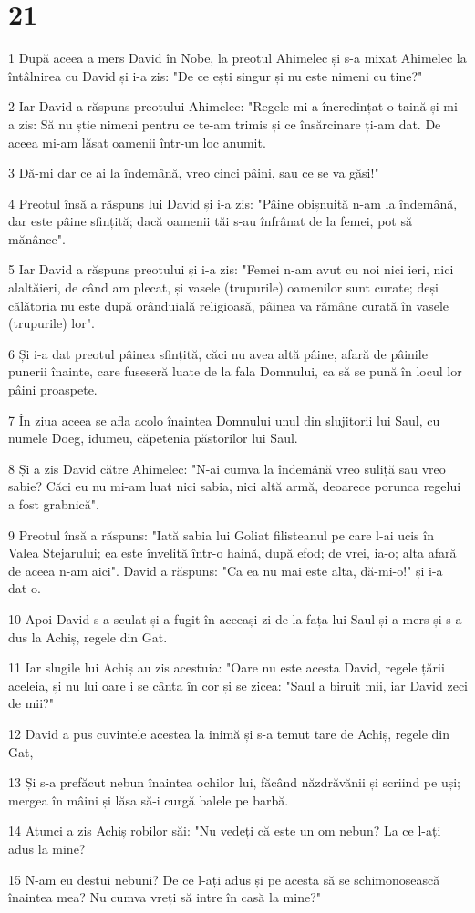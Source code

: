 \chapter{21}

\par 1 După aceea a mers David în Nobe, la preotul Ahimelec și s-a mixat Ahimelec la întâlnirea cu David și i-a zis: "De ce ești singur și nu este nimeni cu tine?"
\par 2 Iar David a răspuns preotului Ahimelec: "Regele mi-a încredințat o taină și mi-a zis: Să nu știe nimeni pentru ce te-am trimis și ce însărcinare ți-am dat. De aceea mi-am lăsat oamenii într-un loc anumit.
\par 3 Dă-mi dar ce ai la îndemână, vreo cinci pâini, sau ce se va găsi!"
\par 4 Preotul însă a răspuns lui David și i-a zis: "Pâine obișnuită n-am la îndemână, dar este pâine sfințită; dacă oamenii tăi s-au înfrânat de la femei, pot să mănânce".
\par 5 Iar David a răspuns preotului și i-a zis: "Femei n-am avut cu noi nici ieri, nici alaltăieri, de când am plecat, și vasele (trupurile) oamenilor sunt curate; deși călătoria nu este după orânduială religioasă, pâinea va rămâne curată în vasele (trupurile) lor".
\par 6 Și i-a dat preotul pâinea sfințită, căci nu avea altă pâine, afară de pâinile punerii înainte, care fuseseră luate de la fala Domnului, ca să se pună în locul lor pâini proaspete.
\par 7 În ziua aceea se afla acolo înaintea Domnului unul din slujitorii lui Saul, cu numele Doeg, idumeu, căpetenia păstorilor lui Saul.
\par 8 Și a zis David către Ahimelec: "N-ai cumva la îndemână vreo suliță sau vreo sabie? Căci eu nu mi-am luat nici sabia, nici altă armă, deoarece porunca regelui a fost grabnică".
\par 9 Preotul însă a răspuns: "Iată sabia lui Goliat filisteanul pe care l-ai ucis în Valea Stejarului; ea este învelită într-o haină, după efod; de vrei, ia-o; alta afară de aceea n-am aici". David a răspuns: "Ca ea nu mai este alta, dă-mi-o!" și i-a dat-o.
\par 10 Apoi David s-a sculat și a fugit în aceeași zi de la fața lui Saul și a mers și s-a dus la Achiș, regele din Gat.
\par 11 Iar slugile lui Achiș au zis acestuia: "Oare nu este acesta David, regele țării aceleia, și nu lui oare i se cânta în cor și se zicea: "Saul a biruit mii, iar David zeci de mii?"
\par 12 David a pus cuvintele acestea la inimă și s-a temut tare de Achiș, regele din Gat,
\par 13 Și s-a prefăcut nebun înaintea ochilor lui, făcând năzdrăvănii și scriind pe uși; mergea în mâini și lăsa să-i curgă balele pe barbă.
\par 14 Atunci a zis Achiș robilor săi: "Nu vedeți că este un om nebun? La ce l-ați adus la mine?
\par 15 N-am eu destui nebuni? De ce l-ați adus și pe acesta să se schimonosească înaintea mea? Nu cumva vreți să intre în casă la mine?"

